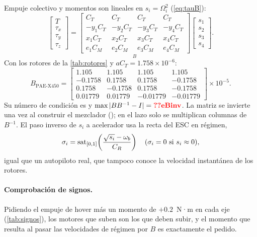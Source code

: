 Empuje colectivo y momentos son lineales en $s_i=\Omega_i^2$
(\cref{eq:tauB}):
\begin{equation}
\begin{bmatrix}T\\ \tau_x\\ \tau_y\\ \tau_z\end{bmatrix}
= \underset{\scriptscriptstyle B}{\begin{bmatrix}
C_T & C_T & C_T & C_T\\
-y_1C_T & -y_2C_T & -y_3C_T & -y_4C_T\\
x_1C_T & x_2C_T & x_3C_T & x_4C_T\\
e_1C_M & e_2C_M & e_3C_M & e_4C_M
\end{bmatrix}}
\begin{bmatrix}s_1\\ s_2\\ s_3\\ s_4\end{bmatrix}.
\label{eq:B}
\end{equation}
Con los rotores de la \cref{tab:rotores} y $aC_T=1.758\times10^{-6}$:
\begin{equation}
B_{\text{PAE-X450}}=\begin{bmatrix}
1.105 & 1.105 & 1.105 & 1.105\\
-0.1758 & 0.1758 & 0.1758 & -0.1758\\
0.1758 & -0.1758 & 0.1758 & -0.1758\\
0.01779 & 0.01779 & -0.01779 & -0.01779
\end{bmatrix}\times10^{-5}.
\end{equation}
Su número de condición es  y $\max|BB^{-1}-I|=\val{eBinv}$. La
matriz se invierte una vez al construir el mezclador ();
en el lazo solo se multiplican columnas de $B^{-1}$. El paso inverso de
$s_i$ a acelerador usa la recta del ESC en régimen,
\begin{equation}
\sigma_i=\operatorname{sat}_{[0,1]}\!\left(\frac{\sqrt{s_i}-\omega_b}{C_R}\right)
\quad(\sigma_i=0 \text{ si } s_i\approx0),
\label{eq:escinv}
\end{equation}
igual que un autopiloto real, que tampoco conoce la velocidad instantánea
de los rotores.

\paragraph{Comprobación de signos.} Pidiendo el empuje de hover más un
momento de $+0.2$~N·m en cada eje (\cref{tab:signos}), los motores que suben
son los que deben subir, y el momento que resulta al pasar las velocidades
de régimen por $B$ es exactamente el pedido.

